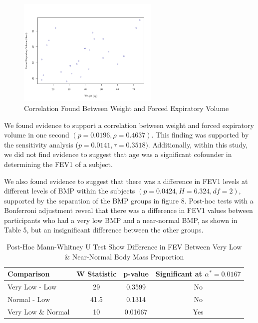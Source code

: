 \documentclass{article}
\begin{document}
		\newpage

		\begin{figure}[h!]
			\centering
			\includegraphics[width=0.6\textwidth]{graph2/ScatterWeightFEV.png}
			\caption{Correlation Found Between Weight and Forced Expiratory Volume}
			\label{fig:histogram}
		\end{figure}


		We found evidence to support a correlation between weight and forced expiratory volume in one second $(p = 0.0196, \rho = 0.4637)$. This finding was supported by the sensitivity analysis ($p = 0.0141, \tau = 0.3518)$. Additionally, within this study, we did not find evidence to suggest that age was a significant cofounder in determining the FEV1 of a subject. 
		
		
		We also found evidence to suggest that there was a difference in FEV1 levels at different levels of BMP within the subjects $(p = 0.0424, H = 6.324, df = 2)$, supported by the separation of the BMP groups in figure 8. Post-hoc tests with a Bonferroni adjustment reveal that there was a difference in FEV1 values between participants who had a very low BMP and a near-normal BMP, as shown in Table 5, but an insignificant difference between the other groups.


		\begin{table}[h!]
			\centering
			\caption{Post-Hoc Mann-Whitney U Test Show Difference in FEV Between Very Low \& Near-Normal Body Mass Proportion}
			\footnotesize
			\begin{tabular}{l c c c}
			\toprule
			\textbf{Comparison} & \textbf{W Statistic} & \textbf{p-value} & \textbf{Significant at $\alpha^* = 0.0167$} \\
			\midrule
			Very Low - Low      & 29                   & 0.3599          & No  \\
			Normal - Low        & 41.5                 & 0.1314          & No  \\
			Very Low \& Normal  & 10                   & 0.01667         & Yes \\
			\bottomrule
			\end{tabular}
		\end{table}
\end{document}
